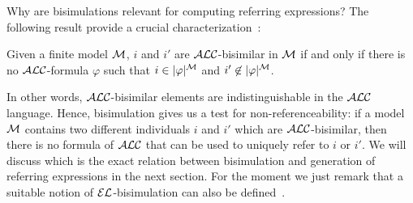 Why are bisimulations relevant for computing referring expressions?
The following result provide a crucial characterization~\cite{blac:moda01}:

\begin{theorem}\label{bisim}
Given a finite model $\mathcal{M}$, $i$ and $i'$ are $\mathcal{ALC}$-bisimilar in $\mathcal{M}$
if and only if there is no $\mathcal{ALC}$-formula $\varphi$ such that $i \in |\varphi|^{\mathcal{M}}$ and
$i' \not \in |\varphi|^{\mathcal{M}}$.
\end{theorem}

In other words, $\mathcal{ALC}$-bisimilar elements are indistinguishable in the $\mathcal{ALC}$ language. Hence, bisimulation gives us a test for non-referenceability: if a
model $\mathcal{M}$ contains two different individuals $i$ and $i'$ which are
$\mathcal{ALC}$-bisimilar, then there is no formula of $\mathcal{ALC}$ that can be used to uniquely
refer to $i$ or $i'$.  We will discuss which is the exact relation between
bisimulation and generation of referring expressions in the next section.
For the moment we just remark that a suitable notion of $\mathcal{EL}$-bisimulation can also be defined~\cite{kurt:expr99}.

